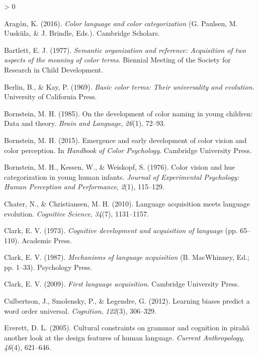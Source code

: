 \documentclass[
  english,
  ,apa7,floatsintext]{apa6}
\newlength{\cslhangindent}
\newenvironment{CSLReferences}[2] %
 {%
  \setlength{\parindent}{0pt}
  \ifodd #1 \everypar{\setlength{\hangindent}{\cslhangindent}}\ignorespaces\fi
  \ifnum #2 > 0
  \setlength{\parskip}{#2\baselineskip}
  \fi
 }%
 {}
\begin{document}
\hypertarget{refs}{}
\begin{CSLReferences}{1}{0}
\leavevmode\hypertarget{ref-aragon2016}{}%
Aragón, K. (2016). \emph{Color language and color categorization} (G. Paulsen, M. Uusküla, \& J. Brindle, Eds.). Cambridge Scholars.

\leavevmode\hypertarget{ref-bartlett1977}{}%
Bartlett, E. J. (1977). \emph{Semantic organization and reference: Acquisition of two aspects of the meaning of color terms}. Biennial Meeting of the Society for Research in Child Development.

\leavevmode\hypertarget{ref-berlin1969}{}%
Berlin, B., \& Kay, P. (1969). \emph{Basic color terms: Their universality and evolution}. University of California Press.

\leavevmode\hypertarget{ref-bornstein1985}{}%
Bornstein, M. H. (1985). On the development of color naming in young children: Data and theory. \emph{Brain and Language}, \emph{26}(1), 72--93.

\leavevmode\hypertarget{ref-bornstein2015}{}%
Bornstein, M. H. (2015). Emergence and early development of color vision and color perception. In \emph{Handbook of {C}olor {P}sychology}. Cambridge University Press.

\leavevmode\hypertarget{ref-bornstein1976}{}%
Bornstein, M. H., Kessen, W., \& Weiskopf, S. (1976). Color vision and hue categorization in young human infants. \emph{Journal of Experimental Psychology: Human Perception and Performance}, \emph{2}(1), 115--129.

\leavevmode\hypertarget{ref-chater2010}{}%
Chater, N., \& Christiansen, M. H. (2010). Language acquisition meets language evolution. \emph{Cognitive Science}, \emph{34}(7), 1131--1157.

\leavevmode\hypertarget{ref-clark1973}{}%
Clark, E. V. (1973). \emph{Cognitive development and acquisition of language} (pp. 65--110). Academic Press.

\leavevmode\hypertarget{ref-clark1987}{}%
Clark, E. V. (1987). \emph{Mechanisms of language acquisition} (B. MacWhinney, Ed.; pp. 1--33). Psychology Press.

\leavevmode\hypertarget{ref-clark2009}{}%
Clark, E. V. (2009). \emph{First language acquisition}. Cambridge University Press.

\leavevmode\hypertarget{ref-culbertson2012}{}%
Culbertson, J., Smolensky, P., \& Legendre, G. (2012). Learning biases predict a word order universal. \emph{Cognition}, \emph{122}(3), 306--329.

\leavevmode\hypertarget{ref-everett2005}{}%
Everett, D. L. (2005). Cultural constraints on grammar and cognition in pirah{ã} another look at the design features of human language. \emph{Current Anthropology}, \emph{46}(4), 621--646.


\end{CSLReferences}
\end{document}
